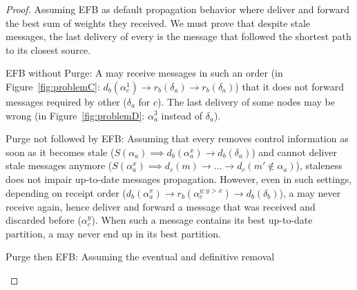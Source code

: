 \begin{proof}
  Assuming EFB as default propagation behavior where \processes
  deliver and forward the best sum of weights they received. We must
  prove that despite stale messages, the last delivery of every
  \process is the message that followed the shortest path to its
  closest source.
  \begin{asparadesc}
  \item [EFB without Purge:] A \process may receive messages in such
    an order (\eg in Figure~\ref{fig:problemC}: $d_b(\alpha_c^1)
    \rightarrow r_b(\delta_a) \rightarrow r_b(\delta_a)$) that it does
    not forward messages required by other \processes ($\delta_a$ for
    $c$). The last delivery of some nodes may be wrong (\eg in
    Figure~\ref{fig:problemD}: $\alpha_a^3$ instead of $\delta_a$).
  \item [Purge not followed by EFB:]
    Assuming that every \process removes control information as soon
    as it becomes stale ($S(\alpha_a) \implies d_b(\alpha_a^x)
    \rightarrow d_b(\delta_a)$) and cannot deliver stale messages
    anymore ($S(\alpha_a^x) \implies d_c(m) \rightarrow \ldots
    \rightarrow d_c(m' \not\in \alpha_a)$), staleness does not impair
    up-to-date messages propagation. However, even in such settings,
    depending on receipt order ($d_b(\alpha_a^{x}) \rightarrow
    r_b(\alpha_c^{y : y > x}) \rightarrow d_b(\delta_b)$), a \process
    may never receive again, hence deliver and forward a message that
    was received and discarded before ($\alpha_c^{y}$). When such a
    message contains its best up-to-date partition, a \process may
    never end up in its best partition.
  \item [Purge then EFB:] Assuming the eventual and definitive removal

\end{asparadesc}
\end{proof}
